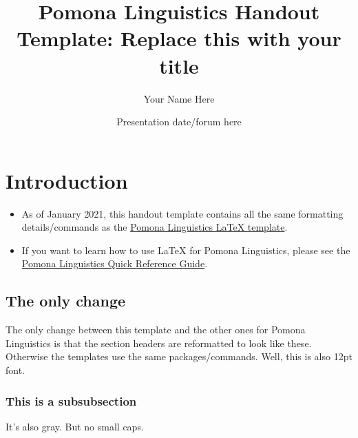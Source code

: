 \documentclass[12pt]{article}
\title{Pomona Linguistics Handout Template: Replace this with your title}
\author{Your Name Here}
\date{Presentation date/forum here}
\begin{document}
\maketitle

\section{Introduction}

\begin{itemize}

\item As of January 2021, this handout template contains all the same formatting details/commands as the \href{https://www.overleaf.com/latex/templates/pomona-linguistics-latex-template/bvdxdtpwysnd}{Pomona Linguistics LaTeX template}. 

\item If you want to learn how to use LaTeX for Pomona Linguistics, please see the \href{https://www.overleaf.com/latex/templates/pomona-linguistics-quick-reference-guide/jthrqbrktmrd}{Pomona Linguistics Quick Reference Guide}.

\end{itemize}

\subsection{The only change}

The only change between this template and the other ones for Pomona Linguistics is that the section headers are reformatted to look like these. Otherwise the templates use the same packages/commands. Well, this is also 12pt font.

\subsubsection{This is a subsubsection}

It's also gray. But no small caps. 
\end{document}
